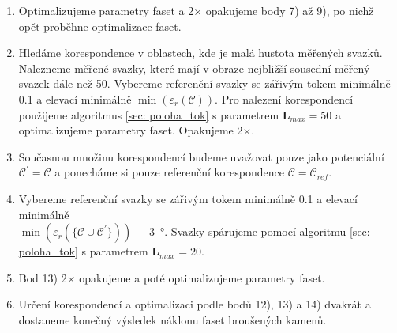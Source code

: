 \begin{enumerate}
\item Optimalizujeme parametry faset a 2$\times$ opakujeme body 7) až 9), po nichž opět proběhne optimalizace faset.  

\item Hledáme korespondence v oblastech, kde je malá hustota měřených svazků.  Nalezneme měřené svazky, které mají v obraze nejbližší sousední měřený svazek dále než \SI{50}{\px}. Vybereme referenční svazky se zářivým tokem minimálně  \SI{0.1}{\permille} a elevací minimálně $\min(\varepsilon_r(\mathcal{C}))$. Pro nalezení korespondencí použijeme algoritmus \ref{sec: poloha_tok} s parametrem $\mathbf{L}_{max} = 50$ a optimalizujeme parametry faset. Opakujeme 2$\times$.

\item Současnou množinu korespondencí budeme uvažovat pouze jako potenciální $\mathcal{C}^\prime = \mathcal{C}$ a ponecháme si pouze referenční korespondence $\mathcal{C} = \mathcal{C}_{ref}$. 

\item Vybereme referenční svazky se zářivým tokem minimálně \SI{0.1}{\permille} a elevací minimálně \\ $\min\left( \varepsilon_r( \lbrace\mathcal{C} \cup \mathcal{C}^\prime\rbrace ) \right) - $ \SI{3}{\degree}. Svazky spárujeme pomocí algoritmu \ref{sec: poloha_tok} s parametrem $\mathbf{L}_{max} = 20$.

\item Bod 13) 2$\times$ opakujeme a poté optimalizujeme parametry faset. 

\item Určení korespondencí a optimalizaci podle bodů 12), 13) a 14) dvakrát a dostaneme konečný výsledek  náklonu faset broušených kamenů.

\end{enumerate}

\clearpage